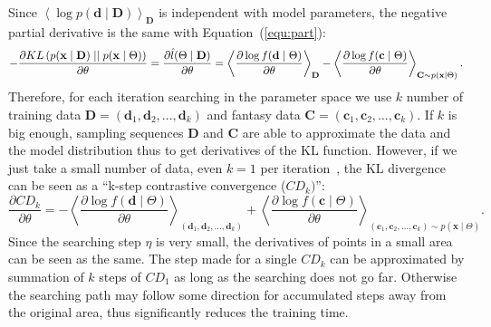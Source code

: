 \documentclass[11pt,twoside,a4paper]{article}
\begin{document}
	Since $\left \langle \log p(\mathbf{d} \mid \mathbf{D}) \right \rangle_{\mathbf{D}}$ is independent with model parameters, the negative partial derivative is the same with Equation~(\ref{equ:part}):
	\begin{equation}
	\label{equ:kl}
		-\dfrac{\partial KL \left( p(\mathbf{x} \mid \mathbf{D}) \mid \mid p(\mathbf{x} \mid \Theta) \right)}{\partial \theta}
		= \dfrac{\partial \hat{l} (\Theta \mid \mathbf{D})}{\partial \theta} \\
		= \left \langle \dfrac{\partial \log f(\mathbf{d} \mid \Theta)}{\partial \theta}\right \rangle_{\mathbf{D}} - \left \langle \dfrac{\partial \log f(\mathbf{c} \mid \Theta)}{\partial \theta}\right \rangle_{\mathbf{C} \sim p(\mathbf{x} \mid \Theta)} .
	\end{equation}
	Therefore, for each iteration searching in the parameter space we use $ k $ number of training data $ \mathbf{D}=(\mathbf{d}_1, \mathbf{d}_2, ..., \mathbf{d}_k) $ and fantasy data $ \mathbf{C}=(\mathbf{c}_1, \mathbf{c}_2, ..., \mathbf{c}_k) $.
	If $ k $ is big enough, sampling sequences $ \mathbf{D} $ and $ \mathbf{C} $ are able to approximate the data and the model distribution thus to get derivatives of the KL function.
	However, if we just take a small number of data, even $ k = 1 $ per iteration~\cite{hinton2002training}, the KL divergence can be seen as a ``k-step contrastive convergence ($ CD_{k}) $'':
	\begin{equation}
	\label{equ:cdk}
		\dfrac{\partial CD_{k}}{\partial \theta} 
		= - \left \langle \dfrac{\partial \log f(\mathbf{d} \mid \Theta)}{\partial \theta}\right \rangle_{(\mathbf{d}_1, \mathbf{d}_2, ..., \mathbf{d}_k) } + \left \langle \dfrac{\partial \log f(\mathbf{c} \mid \Theta)}{\partial \theta}\right \rangle_{(\mathbf{c}_1, \mathbf{c}_2, ..., \mathbf{c}_k) \sim p(\mathbf{x} \mid \Theta)}.
	\end{equation}
	Since the searching step $ \eta $ is very small, the derivatives of points in a small area can be seen as the same.
	The step made for a single $ CD_{k} $ can be approximated by summation of $ k $ steps of $ CD_{1} $ as long as the searching does not go far.
	Otherwise the searching path may follow some direction for accumulated steps away from the original area, thus significantly reduces the training time.
	
\end{document}

